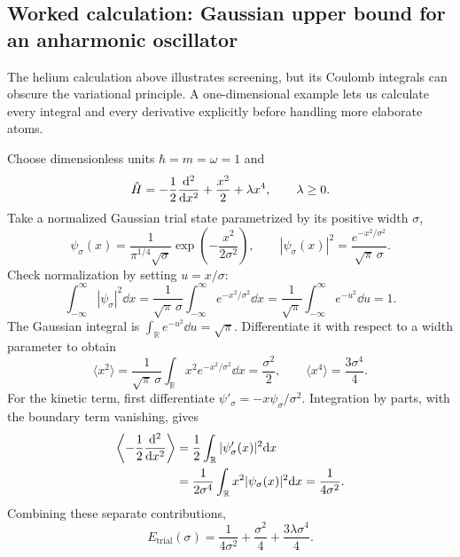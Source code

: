 \subsection*{Worked calculation: Gaussian upper bound for an anharmonic oscillator}
The helium calculation above illustrates screening, but its
Coulomb integrals can obscure the variational principle.
A one-dimensional example lets us calculate every integral
and every derivative explicitly before handling more elaborate atoms.

Choose dimensionless units $\hbar=m=\omega=1$ and
\begin{equation}
\hat{H}=-\frac12\frac{\mathrm{d}^2}{\mathrm{d} x^2}
+\frac{x^2}{2}+\lambda x^4,\qquad\lambda\geq0.
\end{equation}
Take a normalized Gaussian trial state parametrized by
its positive width $\sigma$,
\begin{equation}
\psi_\sigma(x)=\frac{1}{\pi^{1/4}\sqrt\sigma}
 \exp\left(-\frac{x^2}{2\sigma^2}\right),
\qquad
|\psi_\sigma(x)|^2
=\frac{e^{-x^2/\sigma^2}}{\sqrt\pi\,\sigma}.
\end{equation}
Check normalization by setting $u=x/\sigma$:
\begin{equation}
\int_{-\infty}^{\infty}|\psi_\sigma|^2\dd x
=\frac1{\sqrt\pi\,\sigma}
 \int_{-\infty}^{\infty}e^{-x^2/\sigma^2}\dd x
=\frac1{\sqrt\pi}\int_{-\infty}^{\infty}e^{-u^2}\dd u
=1.
\end{equation}
The Gaussian integral is $\int_{\mathbb R}e^{-u^2}\dd u
=\sqrt\pi$. Differentiate it with respect to a width parameter
to obtain
\begin{equation}
\langle x^2\rangle
=\frac1{\sqrt\pi\,\sigma}
 \int_{\mathbb R}x^2e^{-x^2/\sigma^2}\dd x
=\frac{\sigma^2}{2},\qquad
\langle x^4\rangle=\frac{3\sigma^4}{4}.
\end{equation}
For the kinetic term, first differentiate
$\psi'_\sigma=-x\psi_\sigma/\sigma^2$.
Integration by parts, with the boundary term vanishing, gives
\begin{align}
\left\langle-\frac12\frac{\mathrm{d}^2}{\mathrm{d} x^2}\right\rangle
&=\frac12\int_{\mathbb R}|\psi'_\sigma(x)|^2\mathrm{d} x\notag\\
&=\frac{1}{2\sigma^4}\int_{\mathbb R}
 x^2|\psi_\sigma(x)|^2\mathrm{d} x
=\frac{1}{4\sigma^2}.
\end{align}
Combining these separate contributions,
\begin{equation}
\boxed{E_{\mathrm{trial}}(\sigma)
=\frac1{4\sigma^2}+\frac{\sigma^2}4
+\frac{3\lambda\sigma^4}{4}.}
\label{eq:worked-variational-energy}
\end{equation}

